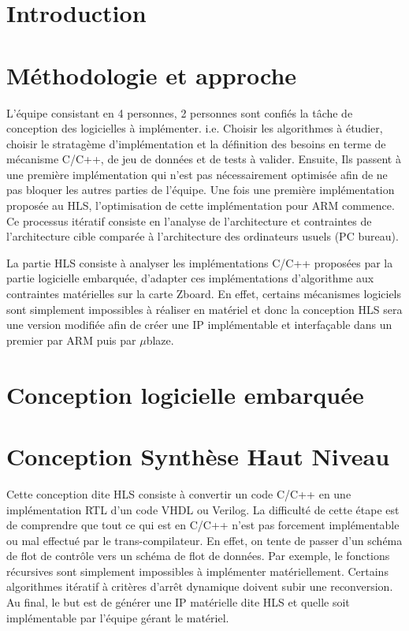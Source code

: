 \documentclass[12pt,a4paper]{article}
\author{\textbf{DOU Yuhan\\ FORCIOLI Quentin \\ GHAOUI Mohamed Anis\\  TERRACHER Audrey}}
\begin{document}

\newpage
\pagestyle{fancy}
\section{Introduction}


\section{Méthodologie et approche}
L'équipe consistant en 4 personnes, 2 personnes sont confiés la tâche de conception des logicielles à implémenter. i.e. Choisir les algorithmes à étudier, choisir le stratagème d'implémentation et la définition des besoins en terme de mécanisme C/C++, de jeu de données  et de tests à valider. Ensuite, Ils passent à une première implémentation qui n'est pas nécessairement optimisée afin de ne pas bloquer les autres parties de l'équipe. Une fois une première implémentation proposée au HLS, l'optimisation de cette implémentation pour ARM commence. Ce processus itératif consiste en l'analyse de l'architecture et contraintes de l'architecture cible comparée à l'architecture des ordinateurs usuels (PC bureau).


La partie HLS consiste à analyser les implémentations C/C++ proposées par la partie logicielle embarquée, d'adapter ces implémentations d'algorithme aux contraintes matérielles sur la carte Zboard. En effet, certains mécanismes logiciels sont simplement impossibles à réaliser en matériel et donc la conception HLS sera une version modifiée afin de créer une IP implémentable et interfaçable dans un premier par ARM puis par $\mu$blaze.

\section{Conception logicielle embarquée}


\section{Conception Synthèse Haut Niveau}
Cette conception dite HLS consiste à convertir un code C/C++ en une implémentation RTL d'un code VHDL ou Verilog. La difficulté de cette étape est de comprendre que tout ce qui est en C/C++ n'est pas forcement implémentable ou mal effectué par le trans-compilateur. En effet, on tente de passer d'un schéma de flot de contrôle vers un schéma de flot de données. Par exemple, le fonctions récursives sont simplement impossibles à implémenter matériellement. Certains algorithmes itératif à critères d'arrêt dynamique doivent subir une reconversion. Au final, le but est de générer une IP matérielle dite HLS et quelle soit implémentable par l'équipe gérant le matériel.
\end{document}

